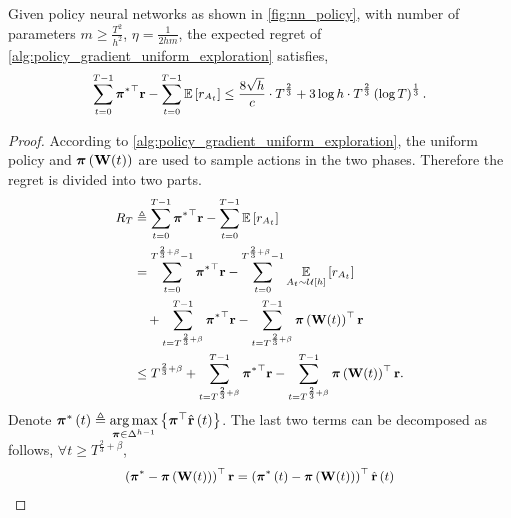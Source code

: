 \begin{thm}
\label{thm:policy_gradient_main_result}
    Given policy neural networks as shown in \cref{fig:nn_policy}, with number of parameters $m \ge \frac{T^2}{h^2}$, $\eta = \frac{1}{2 h m}$, the expected regret of \cref{alg:policy_gradient_uniform_exploration} satisfies,
\begin{equation*}
\small
\begin{split}
    \sum\limits_{t=0}^{T-1}{ {\rvpi^*}^\top \rvr } - \sum\limits_{t=0}^{T-1}{ \sE \left[ r_{A_t} \right] } \le \frac{8 \sqrt{h}}{c} \cdot T^{\frac{2}{3}} + 3 \log{h} \cdot T^{\frac{2}{3}} \left(\log{T}\right)^{\frac{1}{3}}.
\end{split}
\end{equation*}
\end{thm}
\begin{proof}
According to \cref{alg:policy_gradient_uniform_exploration}, the uniform policy and ${\boldsymbol{\pi}}\left( {\mathbf{W}}(t) \right)$ are used to sample actions in the two phases. Therefore the regret is divided into two parts.
\begin{equation}
\small
\label{eq:total_regret_decomposition}
\begin{split}
    R_T &\triangleq \sum\limits_{t=0}^{T-1}{ {\rvpi^*}^\top \rvr } - \sum\limits_{t=0}^{T-1}{ \sE \left[ r_{ A_t} \right] } \\
    &= \sum\limits_{t=0}^{T^{\frac{2}{3} + \beta} - 1}{ {\rvpi^*}^\top \rvr} - \sum\limits_{t=0}^{T^{\frac{2}{3} + \beta} - 1}{ \expectation\limits_{A_t \sim \gU\left[h\right]}{ \left[ r_{A_t} \right] }} \\
    &\quad + \sum\limits_{t=T^{\frac{2}{3} + \beta}}^{T-1}{ {\rvpi^*}^\top \rvr }  - \sum\limits_{t=T^{\frac{2}{3} + \beta}}^{T-1}{ \rvpi\left( \rmW(t) \right)^\top \rvr } \\
    &\le T^{\frac{2}{3} + \beta} + \sum\limits_{t=T^{\frac{2}{3} + \beta}}^{T-1}{ {\rvpi^*}^\top \rvr } - \sum\limits_{t=T^{\frac{2}{3} + \beta}}^{T-1}{ \rvpi\left( \rmW(t) \right)^\top \rvr }.
\end{split}
\end{equation}
Denote ${\boldsymbol{\pi}}^*\left(t\right) \triangleq \operatorname*{arg\,max}\limits_{{\boldsymbol{\pi}} \in \Delta^{h-1}}{\left\{ {\boldsymbol{\pi}}^\top \hat{{\mathbf{r}}}\left(t\right)\right\}}$. The last two terms can be decomposed as follows, $\forall t \ge T^{\frac{2}{3} + \beta}$,
\begin{equation}
\small
\label{eq:playing_learning_phase_regret_decomposition}
\begin{split}
    \left( {\rvpi^*} - \rvpi\left( \rmW(t) \right) \right)^\top \rvr &= \left( {\rvpi^*\left(t\right)} - \rvpi\left( \rmW(t) \right) \right)^\top \hat{\rvr}\left(t\right) \\

\end{split}
\end{equation}
\end{proof}
